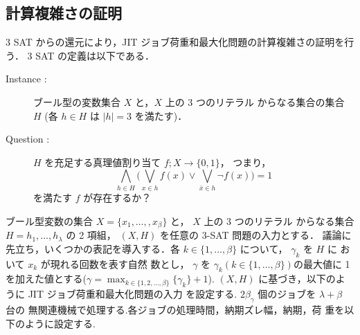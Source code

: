 \documentclass[12pt]{optlab-bachelor}
\begin{document}
\subsection{計算複雑さの証明}
3 SAT からの還元により，JIT ジョブ荷重和最大化問題の計算複雑さの証明を行う．
3 SAT の定義は以下である．
\begin{description}
  \item[Instance : ] ブール型の変数集合 $X$ と，$X$ 上の 3 つのリテラル
  からなる集合の集合 $H$ (各 $h \in H$ は $|h| = 3$ を満たす)．
  \item[Question : ] $H$ を充足する真理値割り当て $f ; X \to \{0,1\}$，
  つまり，
  $$\displaystyle \bigwedge_{h \in H} \bigg(\bigvee_{x \in h}f(x) \lor
  \bigvee_{\bar x \in h}\lnot f(x) \bigg) = 1$$
  を満たす $f$ が存在するか？
\end{description}

ブール型変数の集合 $X = \{x_1,\ldots,,x_β\}$ と， $X$ 上の 3 つのリテラル
からなる集合 $H = {h_1,\ldots,h_{\lambda}}$ の 2 項組， $(X,H)$ を任意の
3-SAT 問題の入力とする．
議論に先立ち，いくつかの表記を導入する．各 $k \in \{1,\ldots,\beta\}$
について， $\gamma_k$ を $H$ に おいて $x_k$ が現れる回数を表す自然
数とし， $\gamma$ を $\gamma_k ( k \in \{1,\ldots,\beta\} )$の最大値に
1 を加えた値とする($\displaystyle \gamma = \max_{k \in \{1,2,\ldots, \beta\}} \{\gamma_k \}+ 1$).
$(X, H)$ に基づき，以下のように JIT ジョブ荷重和最大化問題の入力
を設定する. $2\beta_{\gamma}$ 個のジョブを $\lambda + \beta$ 台の
無関連機械で処理する.各ジョブの処理時間，納期ズレ幅，納期，荷
重を以下のように設定する.
\end{document}
